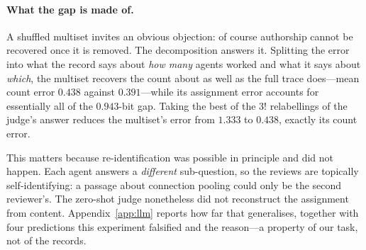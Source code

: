 \paragraph{What the gap is made of.}
A shuffled multiset invites an obvious objection: of course authorship cannot be
recovered once it is removed. The decomposition answers it. Splitting the error
into what the record says about \emph{how many} agents worked and what it says
about \emph{which}, the multiset recovers the count about as well as the full
trace does---mean count error $0.438$ against $0.391$---while its assignment
error accounts for essentially all of the $0.943$-bit gap. Taking the best of the
$3!$ relabellings of the judge's answer reduces the multiset's error from $1.333$
to $0.438$, exactly its count error.

This matters because re-identification was possible in principle and did not
happen. Each agent answers a \emph{different} sub-question, so the reviews are
topically self-identifying: a passage about connection pooling could only be the
second reviewer's. The zero-shot judge nonetheless did not reconstruct the
assignment from content. Appendix~\ref{app:llm} reports how far that generalises,
together with four predictions this experiment falsified and the reason---a
property of our task, not of the records.
